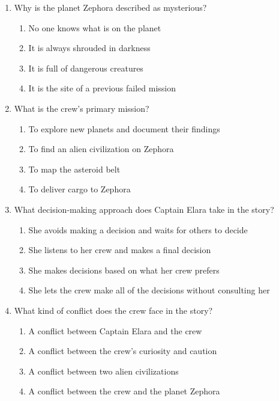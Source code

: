\documentclass[12pt]{article}
\begin{document}
\begin{enumerate}
\vspace{0.5cm}

\item Why is the planet Zephora described as mysterious?
\begin{enumerate}[label=\Alph*.]
    \item No one knows what is on the planet
    \item It is always shrouded in darkness
    \item It is full of dangerous creatures
    \item It is the site of a previous failed mission
\end{enumerate}

\vspace{0.5cm}

\item What is the crew’s primary mission?
\begin{enumerate}[label=\Alph*.]
    \item To explore new planets and document their findings
    \item To find an alien civilization on Zephora
    \item To map the asteroid belt
    \item To deliver cargo to Zephora
\end{enumerate}

\vspace{0.5cm}

\item What decision-making approach does Captain Elara take in the story?
\begin{enumerate}[label=\Alph*.]
    \item She avoids making a decision and waits for others to decide
    \item She listens to her crew and makes a final decision
    \item She makes decisions based on what her crew prefers
    \item She lets the crew make all of the decisions without consulting her
\end{enumerate}

\vspace{0.5cm}

\item What kind of conflict does the crew face in the story?
\begin{enumerate}[label=\Alph*.]
    \item A conflict between Captain Elara and the crew
    \item A conflict between the crew’s curiosity and caution
    \item A conflict between two alien civilizations
    \item A conflict between the crew and the planet Zephora
\end{enumerate}

\end{enumerate}
\end{document}
